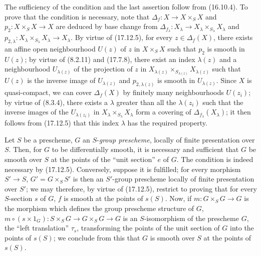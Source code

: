 The sufficiency of the condition and the last assertion follow from (16.10.4). To prove that the condition is necessary, note that $\Delta_f:X\to X\times_SX$ and $p_2:X\times_SX\to X$ are deduced by base change from $\Delta_{f_\lambda}:X_\lambda\to X_\lambda\times_{S_\lambda}X_\lambda$ and $p_{2,\lambda}:X_\lambda\times_{S_\lambda}X_\lambda\to X_\lambda$. By virtue of (17.12.5), for every $z\in\Delta_f(X)$, there exists an affine open neighbourhood $U(z)$ of $z$ in $X\times_SX$ such that $p_2$ is smooth in $U(z)$; by virtue of (8.2.11) and (17.7.8), there exist an index $\lambda(z)$ and a neighbourhood $U_{\lambda(z)}$ of the projection of $z$ in $X_{\lambda(z)}\times_{S_{\lambda(z)}}X_{\lambda(z)}$ such that $U(z)$ is the inverse image of $U_{\lambda(z)}$ and $p_{2,\lambda(z)}$ is smooth in $U_{\lambda(z)}$. Since $X$ is quasi-compact, we can cover $\Delta_f(X)$ by finitely many neighbourhoods $U(z_i)$; by virtue of (8.3.4), there exists a $\lambda$ greater than all the $\lambda(z_i)$ such that the inverse images of the $U_{\lambda(z_i)}$ in $X_\lambda\times_{S_\lambda}X_\lambda$ form a covering of $\Delta_{f_\lambda}(X_\lambda)$; it then follows from (17.12.5) that this index $\lambda$ has the required property.

\begin{example}[17.12.7]
\label{IV.17.12.7}
Let $S$ be a prescheme, $G$ an $S$-\emph{group prescheme}, locally of finite presentation over $S$. Then, for $G$ to be differentially smooth, it is necessary and sufficient that $G$ be smooth over $S$ at the points of the ``unit section'' $e$ of $G$. The condition is indeed necessary by (17.12.5). Conversely, suppose it is fulfilled; for every morphism $S'\to S$, $G'=G\times_SS'$ is then an $S'$-group prescheme locally of finite presentation over $S'$; we may therefore, by virtue of (17.12.5), restrict to proving that for every $S$-section $s$ of $G$, $f$ is smooth at the points of $s(S)$. Now, if $m:G\times_SG\to G$ is the morphism which defines the group prescheme structure of $G$, $m\circ(s\times1_G):S\times_SG\to G\times_SG\to G$ is an
$S$-isomorphism of the prescheme $G$, the ``left translation'' $\tau_s$, transforming the points of the unit section of $G$ into the points of $s(S)$; we conclude from this that $G$ is smooth over $S$ at the points of $s(S)$.
\end{example}

